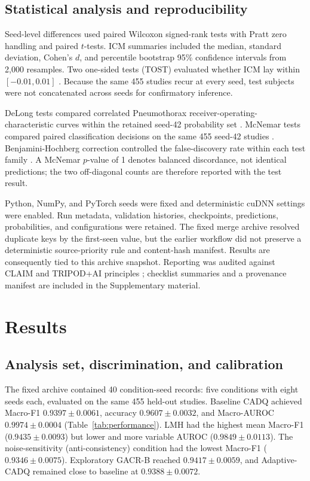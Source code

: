 \documentclass[a4paper,fleqn]{cas-sc}
\begin{document}
\subsection{Statistical analysis and reproducibility}\label{sec:statistics}

Seed-level differences used paired Wilcoxon signed-rank tests with Pratt zero
handling and paired $t$-tests. ICM summaries included the median, standard
deviation, Cohen's $d$, and percentile bootstrap 95\% confidence intervals from
2,000 resamples. Two one-sided tests (TOST) evaluated whether ICM lay within
$[-0.01,0.01]$ \cite{lakens2017equivalence}. Because the same 455 studies recur
at every seed, test subjects were not concatenated across seeds for
confirmatory inference.

DeLong tests compared correlated Pneumothorax receiver-operating-characteristic
curves within the retained seed-42 probability set \cite{delong1988roc}.
McNemar tests compared paired classification decisions on the same 455 seed-42
studies \cite{mcnemar1947correlated}. Benjamini-Hochberg correction controlled
the false-discovery rate within each test family
\cite{benjamini1995fdr}. A McNemar $p$-value of 1 denotes balanced discordance,
not identical predictions; the two off-diagonal counts are therefore reported
with the test result.

Python, NumPy, and PyTorch seeds were fixed and deterministic cuDNN settings
were enabled. Run metadata, validation histories, checkpoints, predictions,
probabilities, and configurations were retained. The fixed merge archive
resolved duplicate keys by the first-seen value, but the earlier workflow did
not preserve a deterministic source-priority rule and content-hash manifest.
Results are consequently tied to this archive snapshot. Reporting was audited
against CLAIM and TRIPOD+AI principles
\cite{mongan2024claim,collins2024tripodai}; checklist summaries and a provenance
manifest are included in the Supplementary material.

\section{Results}\label{sec:results}

\subsection{Analysis set, discrimination, and calibration}\label{sec:performance}

The fixed archive contained 40 condition-seed records: five conditions with
eight seeds each, evaluated on the same 455 held-out studies. Baseline CADQ
achieved Macro-F1 $0.9397\pm0.0061$, accuracy $0.9607\pm0.0032$, and
Macro-AUROC $0.9974\pm0.0004$ (Table~\ref{tab:performance}). LMH had the
highest mean Macro-F1 ($0.9435\pm0.0093$) but lower and more variable AUROC
($0.9849\pm0.0113$). The noise-sensitivity (anti-consistency) condition had
the lowest Macro-F1 ($0.9346\pm0.0075$). Exploratory GACR-B reached
$0.9417\pm0.0059$, and
Adaptive-CADQ remained close to baseline at $0.9388\pm0.0072$.
\end{document}
